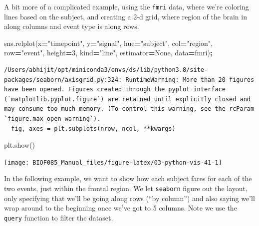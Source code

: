 \documentclass[
  letterpaper,
]{scrbook}
\newenvironment{Shaded}{\begin{snugshade}}{\end{snugshade}}
\newcommand{\DecValTok}[1]{\textcolor[rgb]{0.00,0.00,0.81}{#1}}
\newcommand{\NormalTok}[1]{#1}
\newcommand{\OperatorTok}[1]{\textcolor[rgb]{0.81,0.36,0.00}{\textbf{#1}}}
\newcommand{\StringTok}[1]{\textcolor[rgb]{0.31,0.60,0.02}{#1}}
\newcommand{\VariableTok}[1]{\textcolor[rgb]{0.00,0.00,0.00}{#1}}
\begin{document}
A bit more of a complicated example, using the \texttt{fmri} data, where we're coloring lines based on the subject, and creating a 2-d grid, where region of the brain in along columns and event type is along rows.

\begin{Shaded}
\begin{Highlighting}[]
\NormalTok{sns.relplot(x}\OperatorTok{=}\StringTok{"timepoint"}\NormalTok{, y}\OperatorTok{=}\StringTok{"signal"}\NormalTok{, hue}\OperatorTok{=}\StringTok{"subject"}\NormalTok{,}
\NormalTok{            col}\OperatorTok{=}\StringTok{"region"}\NormalTok{, row}\OperatorTok{=}\StringTok{"event"}\NormalTok{, height}\OperatorTok{=}\DecValTok{3}\NormalTok{,}
\NormalTok{            kind}\OperatorTok{=}\StringTok{"line"}\NormalTok{, estimator}\OperatorTok{=}\VariableTok{None}\NormalTok{, data}\OperatorTok{=}\NormalTok{fmri)}\OperatorTok{;}
\end{Highlighting}
\end{Shaded}

\begin{verbatim}
/Users/abhijit/opt/miniconda3/envs/ds/lib/python3.8/site-packages/seaborn/axisgrid.py:324: RuntimeWarning: More than 20 figures have been opened. Figures created through the pyplot interface (`matplotlib.pyplot.figure`) are retained until explicitly closed and may consume too much memory. (To control this warning, see the rcParam `figure.max_open_warning`).
  fig, axes = plt.subplots(nrow, ncol, **kwargs)
\end{verbatim}

\begin{Shaded}
\begin{Highlighting}[]
\NormalTok{plt.show()}
\end{Highlighting}
\end{Shaded}

\begin{center}\texttt{[image: BIOF085\_Manual\_files/figure-latex/03-python-vis-41-1]} \end{center}

In the following example, we want to show how each subject fares for each of the two events, just within the frontal region. We let \texttt{seaborn} figure out the layout, only specifying that we'll be going along rows (``by column'') and also saying we'll wrap around to the beginning once we've got to 5 columns. Note we use the \texttt{query} function to filter the dataset.
\end{document}
